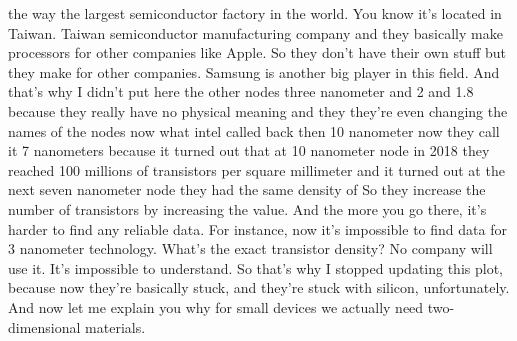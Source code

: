 the way the largest semiconductor factory in the world. You know it's located in Taiwan. Taiwan semiconductor manufacturing company and they basically make processors for other companies like Apple. So they don't have their own stuff but they make for other companies. Samsung is another big player in this field. And that's why I didn't put here the other nodes three nanometer and 2 and 1.8 because they really have no physical meaning and they they're even changing the names of the nodes now what intel called back then 10 nanometer now they call it 7 nanometers because it turned out that at 10 nanometer node in 2018 they reached 100 millions of transistors per square millimeter and it turned out at the next seven nanometer node they had the same density of So they increase the number of transistors by increasing the value. And the more you go there, it's harder to find any reliable data. For instance, now it's impossible to find data for 3 nanometer technology. What's the exact transistor density? No company will use it. It's impossible to understand. So that's why I stopped updating this plot, because now they're basically stuck, and they're stuck with silicon, unfortunately. And now let me explain you why for small devices we actually need two-dimensional materials.
